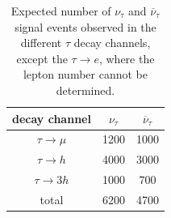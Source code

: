 \begin{itemize}
\begin{table}[htp]
\begin{center}
\begin{tabular}{c | c| c }
\hline
  decay channel &  $\nu_\tau$  & $\overline{\nu}_\tau$  \\
                    
 \hline
 $\tau \to \mu$  & 1200 & 1000 \\
 $\tau \to h$      & 4000  & 3000 \\
 $\tau \to 3h$    & 1000  & 700 \\

 \hline
 total & 6200 & 4700  \\
 \hline
 \end{tabular}
 \end{center}
 \caption{Expected number of $\nu_\tau$ and $\overline{\nu}_\tau$ signal events observed in the different $\tau$ decay channels, except the $\tau \to e$, where the lepton number cannot be determined.}
 \label{tab:tau_yield}
 \end{table}
 
\end{itemize}


